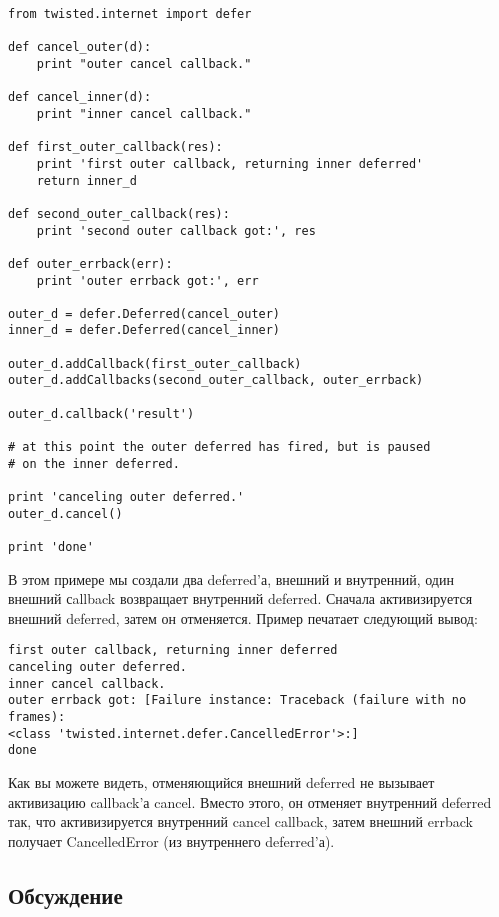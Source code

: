  \begin{verbatim}
from twisted.internet import defer

def cancel_outer(d):
    print "outer cancel callback."

def cancel_inner(d):
    print "inner cancel callback."

def first_outer_callback(res):
    print 'first outer callback, returning inner deferred'
    return inner_d

def second_outer_callback(res):
    print 'second outer callback got:', res

def outer_errback(err):
    print 'outer errback got:', err

outer_d = defer.Deferred(cancel_outer)
inner_d = defer.Deferred(cancel_inner)

outer_d.addCallback(first_outer_callback)
outer_d.addCallbacks(second_outer_callback, outer_errback)

outer_d.callback('result')

# at this point the outer deferred has fired, but is paused
# on the inner deferred.

print 'canceling outer deferred.'
outer_d.cancel()

print 'done'
\end{verbatim} 

В этом примере мы создали два deferred'а, внешний и внутренний, 
один внешний сallback возвращает внутренний deferred. Сначала активизируется 
внешний deferred, затем он отменяется. Пример печатает следующий вывод:

 \begin{verbatim}
first outer callback, returning inner deferred
canceling outer deferred.
inner cancel callback.
outer errback got: [Failure instance: Traceback (failure with no frames): 
<class 'twisted.internet.defer.CancelledError'>:]
done
\end{verbatim} 


Как вы можете видеть, отменяющийся внешний deferred не 
вызывает активизацию callback'а cancel. Вместо этого, 
он отменяет внутренний deferred так, что активизируется 
внутренний cancel callback, затем внешний errback 
получает CancelledError (из внутреннего deferred'а).


\subsection{Обсуждение}

